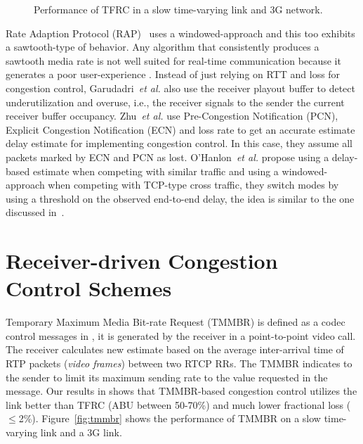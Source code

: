 \begin{figure}
  \centerline{
  }
  \caption{Performance of TFRC in a slow time-varying link and 3G network.}
  \label{fig:tfrc}
\end{figure}

Rate Adaption Protocol (RAP)~\cite{rap:752152} uses a windowed-approach and
this too exhibits a sawtooth-type of behavior. Any algorithm that consistently
produces a sawtooth media rate is not well suited for real-time communication
because it generates a poor user-experience
\cite{Gharai:2002wt,VladBalan:2007dq, Zink03subjectiveimpression}. Instead of
just relying on RTT and loss for congestion control, Garudadri~\textit{et
al.}\cite{4397059} also use the receiver playout buffer to detect
underutilization and overuse, i.e., the receiver signals to the sender the
current receiver buffer occupancy. Zhu~\textit{et al.}\cite{rmcat-nada} use
Pre-Congestion Notification (PCN), Explicit Congestion Notification (ECN) and
loss rate to get an accurate estimate delay estimate for implementing
congestion control. In this case, they assume all packets marked by ECN and
PCN as lost. O'Hanlon~\textit{et al.}\cite{rmcat-dflow} propose using a
delay-based estimate when competing with similar traffic and using a
windowed-approach when competing with TCP-type cross traffic, they switch
modes by using a threshold on the observed end-to-end delay, the idea is
similar to the one discussed in~\cite{budzisz2011fair}.


\section{Receiver-driven Congestion Control Schemes}

Temporary Maximum Media Bit-rate Request (TMMBR) is defined as a codec control
messages in \cite{rfc5104}, it is generated by the receiver in a
point-to-point video call. The receiver calculates new estimate based on the
average inter-arrival time of RTP packets (\emph{video frames}) between two
RTCP RRs. The TMMBR indicates to the sender to limit its maximum sending rate
to the value requested in the message. Our results in  shows
that TMMBR-based congestion control utilizes the link better than TFRC (ABU
between 50-70\%) and much lower fractional loss ($\le$2\%).
Figure~\ref{fig:tmmbr} shows the performance of TMMBR on a slow time-varying
link and a 3G link.

